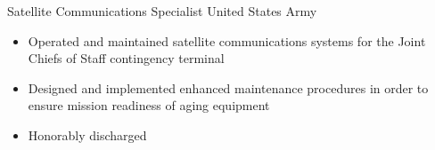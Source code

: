     {Satellite Communications Specialist}
    {United States Army}
    {}
    {}
    {\begin{itemize}
        \item Operated and maintained satellite communications systems for the Joint Chiefs of Staff
        contingency terminal
        \item Designed and implemented enhanced maintenance procedures in order to ensure mission
        readiness of aging equipment
        \item Honorably discharged
    \end{itemize}}